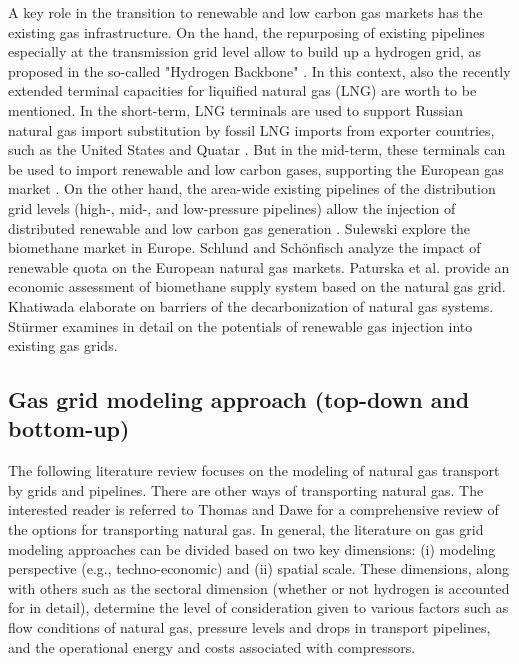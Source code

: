 A key role in the transition to renewable and low carbon gas markets has the existing gas infrastructure. On the hand, the repurposing of existing pipelines especially at the transmission grid level allow to build up a hydrogen grid, as proposed in the so-called "Hydrogen Backbone" \cite{hydrogen_backbone}. In this context, also the recently extended terminal capacities for liquified natural gas (LNG) are worth to be mentioned. In the short-term, LNG terminals are used to support Russian natural gas import substitution by fossil LNG imports from exporter countries, such as the United States and Quatar \cite{brauers2021liquefied}. But in the mid-term, these terminals can be used to import renewable and low carbon gases, supporting the European gas market \cite{al2022emerging}. On the other hand, the area-wide existing pipelines of the distribution grid levels (high-, mid-, and low-pressure pipelines) allow the injection of distributed renewable and low carbon gas generation \cite{cucchiella2018profitability}. Sulewski \cite{sulewski2023development} explore the biomethane market in Europe. Schlund and Schönfisch \cite{schlund2021analysing} analyze the impact of renewable quota on the European natural gas markets. Paturska et al. \cite{paturska2015economic} provide an economic assessment of biomethane supply system based on the natural gas grid. Khatiwada \cite{khatiwada2022decarbonization} elaborate on barriers of the decarbonization of natural gas systems. Stürmer \cite{sturmer2020greening} examines in detail on the potentials of renewable gas injection into existing gas grids. 

\subsection{Gas grid modeling approach (top-down and bottom-up)}\label{approaches}
The following literature review focuses on the modeling of natural gas transport by grids and pipelines. There are other ways of transporting natural gas. The interested reader is referred to Thomas and Dawe \cite{thomas2003review} for a comprehensive review of the options for transporting natural gas. In general, the literature on gas grid modeling approaches can be divided based on two key dimensions: (i) modeling perspective (e.g., techno-economic) and (ii) spatial scale. These dimensions, along with others such as the sectoral dimension (whether or not hydrogen is accounted for in detail), determine the level of consideration given to various factors such as flow conditions of natural gas, pressure levels and drops in transport pipelines, and the operational energy and costs associated with compressors.\vspace{0.3cm}

